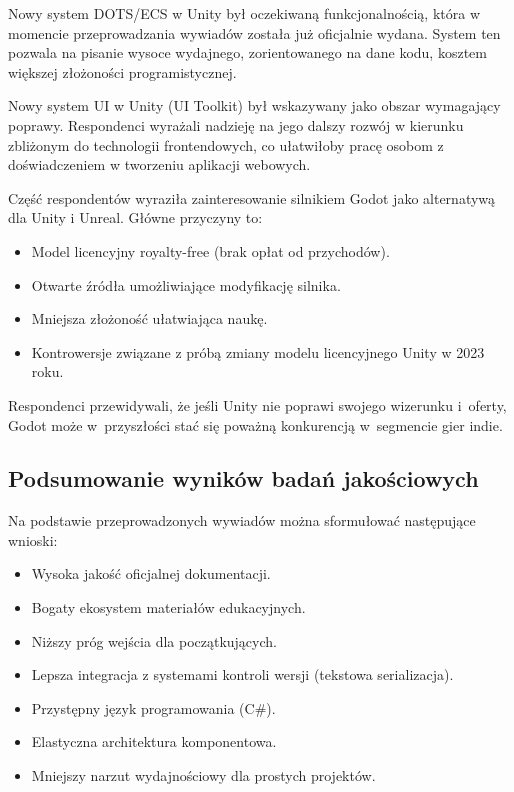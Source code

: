 Nowy system DOTS/ECS w Unity był oczekiwaną funkcjonalnością, która w momencie przeprowadzania 
wywiadów została już oficjalnie wydana. System ten pozwala na pisanie wysoce wydajnego, 
zorientowanego na dane kodu, kosztem większej złożoności programistycznej.


Nowy system UI w Unity (UI Toolkit) był wskazywany jako obszar wymagający poprawy. Respondenci wyrażali nadzieję na jego dalszy rozwój w kierunku zbliżonym do technologii frontendowych, co ułatwiłoby pracę osobom z doświadczeniem w tworzeniu aplikacji webowych.


Część respondentów wyraziła zainteresowanie silnikiem Godot jako alternatywą dla Unity i Unreal. Główne przyczyny to:
\begin{itemize}
    \item Model licencyjny royalty-free (brak opłat od przychodów).
    \item Otwarte źródła umożliwiające modyfikację silnika.
    \item Mniejsza złożoność ułatwiająca naukę.
    \item Kontrowersje związane z próbą zmiany modelu licencyjnego Unity w 2023 roku.
\end{itemize}

Respondenci przewidywali, że jeśli Unity nie poprawi swojego wizerunku
i~oferty, Godot może w~przyszłości stać się poważną konkurencją w~segmencie gier indie.
\newpage
\subsection{Podsumowanie wyników badań jakościowych}
\label{subsec:podsumowanie-wywiady}

Na podstawie przeprowadzonych wywiadów można sformułować następujące wnioski:

\begin{itemize}
    \item Wysoka jakość oficjalnej dokumentacji.
    \item Bogaty ekosystem materiałów edukacyjnych.
    \item Niższy próg wejścia dla początkujących.
    \item Lepsza integracja z systemami kontroli wersji (tekstowa serializacja).
    \item Przystępny język programowania (C\#).
    \item Elastyczna architektura komponentowa.
    \item Mniejszy narzut wydajnościowy dla prostych projektów.
\end{itemize}

